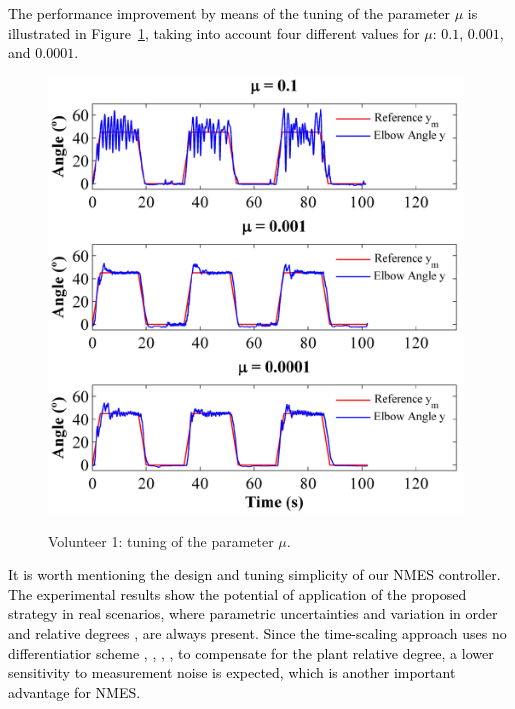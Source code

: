 \documentclass[review]{elsarticle}
\begin{document}
\textcolor{black}{The performance improvement by means of the tuning of the parameter $\mu$ is illustrated
in Figure~\ref{fig52_tuning}, taking into account four different values for $\mu$: $0.1$, $0.001$, and $0.0001$.}
%
\begin{figure}[!htb]
\begin{center}
\includegraphics[width=11cm]{Muuu2_new}
\caption{Volunteer 1: tuning of the parameter $\mu$.}
\vspace{-1cm}
\label{fig52_tuning}
\end{center}
\end{figure}

%
\textcolor{black}{It is worth mentioning the design and tuning simplicity of our NMES controller. The experimental results show the potential of application of the proposed strategy in real scenarios, where parametric uncertainties and variation in order and relative degrees \cite{L:2012}, \cite{BPU:2008} are always present. Since the time-scaling approach uses no differentiatior scheme \cite{Lev:03}, \cite{AFL:2012}, \cite{FSEY:2008}, \cite{BFU:1998}, \cite{OPH:2013} to compensate for the plant relative degree, a lower sensitivity to measurement noise is expected, which is another important advantage for NMES.}
\end{document}

